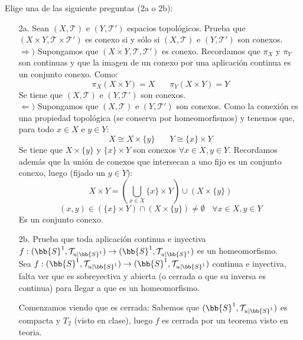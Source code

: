 \documentclass[12pt]{article}
\newcounter{ejercicio}[section] %
\newcounter{ejercicio}
\begin{document}
    \begin{ejercicio}[2.5 puntos]
        Elige una de las siguiente preguntas (2a o 2b):
        \begin{enumerate}
            \item[2a.] Sean $(X, \mathcal{T})$ e $(Y, \mathcal{T}')$ espacios topológicos. Prueba que $(X\times Y, \mathcal{T}\times \mathcal{T}')$ es conexo si y sólo si $(X, \mathcal{T})$ e $(Y, \mathcal{T}')$ son conexos.\\

                \noindent
                $\Rightarrow)$ Supongamos que $(X \times Y, \mathcal{T}, \mathcal{T}')$ es conexo. Recordamos que $\pi_X$ y $\pi_Y$ son continuas y que la imagen de un conexo por una aplicación continua es un conjunto conexo. Como:
                $$\pi_X(X\times Y) = X~~~~~~~~\pi_Y(X \times Y) = Y$$
                Se tiene que $(X, \mathcal{T})$ e $(Y, \mathcal{T}')$ son conexos.\\

                \noindent
                $\Leftarrow)$ Supongamos que $(X, \mathcal{T})$ e $(Y, \mathcal{T}')$ son conexos. Como la conexión es una propiedad topológica (se conserva por homeomorfismos) y tenemos que, para todo $x \in X$ e $y \in Y$:
                $$X \cong X \times \{y\}~~~~~~~~ Y \cong \{x\} \times Y$$
                Se tiene que $X \times \{y\}$ y $\{x\} \times Y$ son conexos $\forall x \in X, y \in Y$.\newline
                Recordamos además que la unión de conexos que intersecan a uno fijo es un conjunto conexo, luego (fijado un $y \in Y$):
                $$X \times Y = \left( \bigcup_{x \in X} \{x\} \times Y\right) \cup (X \times \{y\})$$
                $$ (x,y) \in (\{x\} \times Y) \cap (X \times \{y\}) \neq \emptyset~~~~\forall x \in X, y \in Y$$
                Es un conjunto conexo.
                
            \item[2b.] Prueba que toda aplicación continua e inyectiva $f:(\bb{S}^1, \mathcal{T}_{u|\bb{S}^1}) \rightarrow (\bb{S}^1, \mathcal{T}_{u|\bb{S}^1})$ es un homeomorfismo.\\

                \noindent
                Sea $f:(\bb{S}^1, \mathcal{T}_{u|\bb{S}^1}) \rightarrow (\bb{S}^1, \mathcal{T}_{u|\bb{S}^1})$ continua e inyectiva, falta ver que es sobreyectiva y abierta (o cerrada o que su inversa es continua) para llegar a que es un homeomorfismo.

                \noindent
                Comenzamos viendo que es cerrada:\newline
                Sabemos que $(\bb{S}^1, \mathcal{T}_{u|\bb{S}^1})$ es compacta y $T_2$ (visto en clase), luego $f$ es cerrada por un teorema visto en teoria.


\end{enumerate}
\end{ejercicio}
\end{document}

